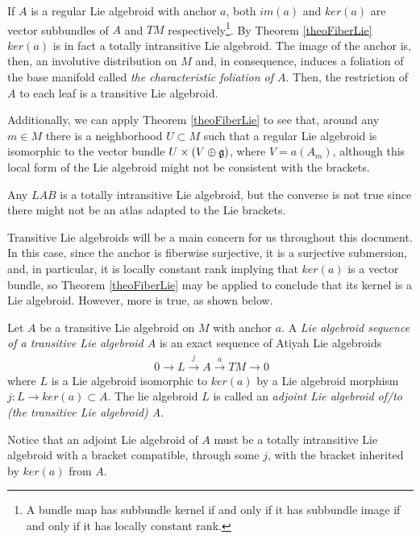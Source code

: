 \begin{remark}
If $A$ is a regular Lie algebroid with anchor $a$, both $im(a)$ and $ker(a)$ are vector subbundles of $A$ and $TM$ respectively\footnote{A bundle map has subbundle kernel if and only if it has subbundle image if and only if it has locally constant rank.}. By Theorem \ref{theoFiberLie} $ker(a)$ is in fact a totally intransitive Lie algebroid. The image of the anchor is, then, an involutive distribution on $M$ and, in consequence, induces a foliation of the base manifold called \emph{the characteristic foliation of $A$}. Then, the restriction of $A$ to each leaf is a transitive Lie algebroid.

Additionally, we can apply Theorem \ref{theoFiberLie} to see that, around any $m \in M$ there is a neighborhood $U \subset M$ such that a regular Lie algebroid is isomorphic to the vector bundle $U \times (V \oplus \mathfrak{g})$, where $V = a(A_m)$, although this local form of the Lie algebroid might not be consistent with the brackets.%
\end{remark}

\begin{remark}
Any $LAB$ is a totally intransitive Lie algebroid, but the converse is not true since there might not be an atlas adapted to the Lie brackets.
\end{remark}

Transitive Lie algebroids will be a main concern for us throughout this document. In this case, since the anchor is fiberwise surjective, it is a surjective submersion, and, in particular, it is locally constant rank implying that $ker(a)$ is a vector bundle, so Theorem \ref{theoFiberLie} may be applied to conclude that its kernel is a Lie algebroid. However, more is true, as shown below.

\begin{definition}\label{definitionTransitiveLieAlgebroidSequenceLiealgebroidsequenceofatransitiveliealgebroidA}
Let $A$ be a transitive Lie algebroid on $M$ with anchor $a$. A \emph{Lie algebroid sequence of a transitive Lie algebroid $A$} is an exact sequence of Atiyah Lie algebroids
\begin{align}\
    0 \to L \xrightarrow{j} A \xrightarrow{a} TM \to 0
\end{align}
where $L$ is a Lie algebroid isomorphic to $ker(a)$ by a Lie algebroid morphism $j:L \to ker(a) \subset A$. The lie algebroid $L$ is called an \emph{adjoint Lie algebroid of/to (the transitive Lie algebroid) A}.
\end{definition}
Notice that an adjoint Lie algebroid of $A$ must be a totally intransitive Lie algebroid with a bracket compatible, through some $j$, with the bracket inherited by $ker(a)$ from $A$.

